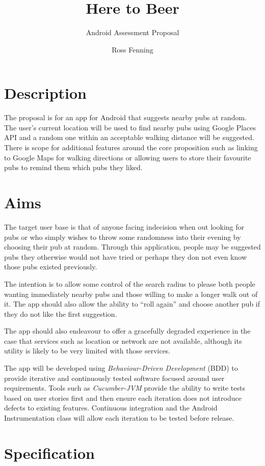 \documentclass{article}
\title{Here to Beer}
\subtitle{Android Assessment Proposal}
\author{Ross Fenning}
\begin{document}
\maketitle

\section{Description}

The proposal is for an app for Android that suggests nearby pubs at random.
The user's current location will be used to find nearby pubs using Google
Places API and a random one within an acceptable walking distance will be
suggested. There is scope for additional features around the core proposition
such as linking to Google Maps for walking directions or allowing users
to store their favourite pubs to remind them which pubs they liked.

\section{Aims}

The target user base is that of anyone facing indecision when out looking for
pubs or who simply wishes to throw some randomness into their evening by
choosing their pub at random. Through this application, people may be suggested
pubs they otherwise would not have tried or perhaps they don not even know
those pubs existed previously.

The intention is to allow some control of the search radius to please both
people wanting immediately nearby pubs and those willing to make a longer
walk out of it. The app should also allow the ability to ``roll again'' and
choose another pub if they do not like the first suggestion.

The app should also endeavour to offer a gracefully degraded experience in
the case that services such as location or network are not available,
although its utility is likely to be very limited with those services.

The app will be developed using \emph{Behaviour-Driven Development} (BDD)
to provide
iterative and continuously tested software focused around user requirements.
Tools such as \emph{Cucumber-JVM} provide the ability to write tests based
on user stories first and then ensure each iteration does not introduce
defects to existing features. Continuous integration and the Android
Instrumentation class will allow each iteration to be tested before release.

\section{Specification}
\end{document}
